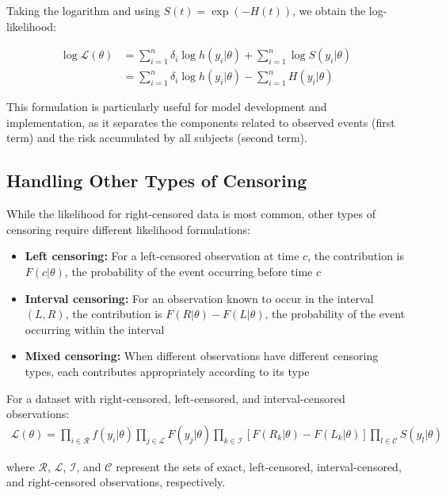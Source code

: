 Taking the logarithm and using $S(t) = \exp(-H(t))$, we obtain the log-likelihood:

\begin{equationbox}[title=Log-Likelihood for Survival Data]
\begin{align}
    \log\mathcal{L}(\theta) &= \sum_{i=1}^{n} \delta_i \log h(y_i|\theta) + \sum_{i=1}^{n} \log S(y_i|\theta) \\
    &= \sum_{i=1}^{n} \delta_i \log h(y_i|\theta) - \sum_{i=1}^{n} H(y_i|\theta)
\end{align}
\end{equationbox}

This formulation is particularly useful for model development and implementation, as it separates the components related to observed events (first term) and the risk accumulated by all subjects (second term).

\subsection{Handling Other Types of Censoring}

While the likelihood for right-censored data is most common, other types of censoring require different likelihood formulations:

\begin{itemize}
    \item \textbf{Left censoring:} For a left-censored observation at time $c$, the contribution is $F(c|\theta)$, the probability of the event occurring before time $c$
    
    \item \textbf{Interval censoring:} For an observation known to occur in the interval $(L, R)$, the contribution is $F(R|\theta) - F(L|\theta)$, the probability of the event occurring within the interval
    
    \item \textbf{Mixed censoring:} When different observations have different censoring types, each contributes appropriately according to its type
\end{itemize}

\begin{examplebox}[title=General Likelihood with Multiple Censoring Types]
For a dataset with right-censored, left-censored, and interval-censored observations:
\begin{align}
    \mathcal{L}(\theta) = \prod_{i \in \mathcal{R}} f(y_i|\theta) \prod_{j \in \mathcal{L}} F(y_j|\theta) \prod_{k \in \mathcal{I}} [F(R_k|\theta) - F(L_k|\theta)] \prod_{l \in \mathcal{C}} S(y_l|\theta)
\end{align}

where $\mathcal{R}$, $\mathcal{L}$, $\mathcal{I}$, and $\mathcal{C}$ represent the sets of exact, left-censored, interval-censored, and right-censored observations, respectively.
\end{examplebox}

